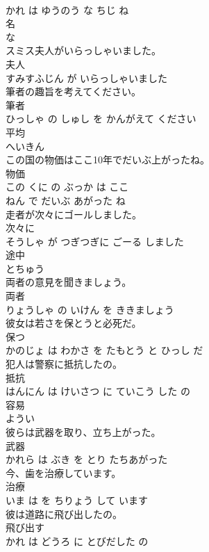 \documentclass[8pt]{extreport}
\begin{document}
\begin{CJK}{UTF8}{min}
\\	かれ は ゆうのう な ちじ ね			
\\	名	
\\	な			
\\	スミス夫人がいらっしゃいました。	
\\	夫人 
\\	すみすふじん が いらっしゃいました			
\\	筆者の趣旨を考えてください。	
\\	筆者 
\\	ひっしゃ の しゅし を かんがえて ください			
\\	平均	
\\	へいきん			
\\	この国の物価はここ10年でだいぶ上がったね。	
\\	物価 
\\	この くに の ぶっか は ここ 
\\	ねん で だいぶ あがった ね			
\\	走者が次々にゴールしました。	
\\	次々に 
\\	そうしゃ が つぎつぎに ごーる しました			
\\	途中	
\\	とちゅう			
\\	両者の意見を聞きましょう。	
\\	両者 
\\	りょうしゃ の いけん を ききましょう			
\\	彼女は若さを保とうと必死だ。	
\\	保つ 
\\	かのじょ は わかさ を たもとう と ひっし だ			
\\	犯人は警察に抵抗したの。	
\\	抵抗 
\\	はんにん は けいさつ に ていこう した の			
\\	容易	
\\	ようい			
\\	彼らは武器を取り、立ち上がった。	
\\	武器 
\\	かれら は ぶき を とり たちあがった			
\\	今、歯を治療しています。	
\\	治療 
\\	いま は を ちりょう して います			
\\	彼は道路に飛び出したの。	
\\	飛び出す 
\\	かれ は どうろ に とびだした の			

\end{CJK}
\end{document}
